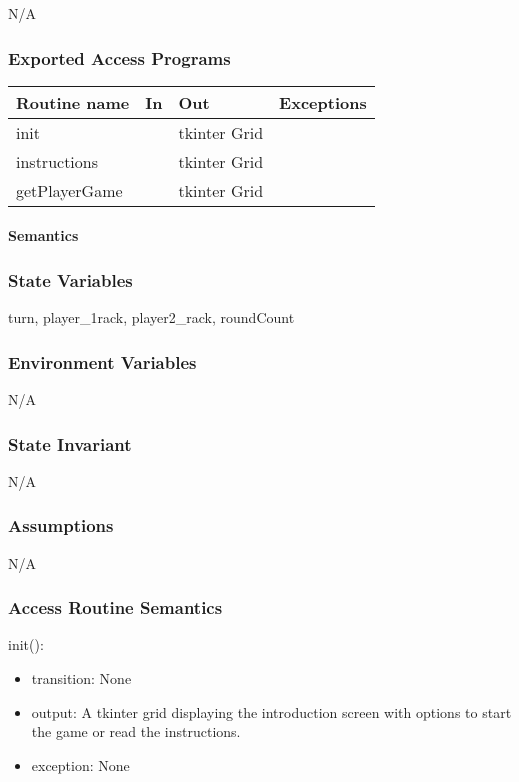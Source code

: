 \documentclass[12pt]{article}
\begin{document}
N/A

\subsubsection* {Exported Access Programs}

\begin{tabular}{| l | l | l | l |}
\hline
\textbf{Routine name} & \textbf{In} & \textbf{Out} & \textbf{Exceptions}\\
\hline
init & & tkinter Grid & \\
\hline
instructions & & tkinter Grid & \\
\hline
getPlayerGame & & tkinter Grid & \\
\hline
\end{tabular}

\paragraph* {Semantics}

\subsubsection*{State Variables}

turn, player\_1rack, player2\_rack, roundCount

\subsubsection*{Environment Variables}

N/A

\subsubsection*{State Invariant}

N/A

\subsubsection*{Assumptions}

N/A

\subsubsection* {Access Routine Semantics}

\noindent init():
\begin{itemize}
\item transition: None
\item output: A tkinter grid displaying the introduction screen with options to start the game or read the instructions.
\item exception: None
\end{itemize}
\end{document}
